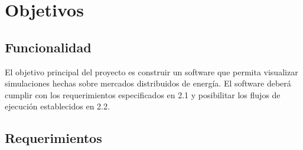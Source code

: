 \documentclass[12pt,a4paper,openright,oneside]{article}
\numberwithin{equation}{section}
\theoremstyle{definition}
\begin{document}













\section{Objetivos}

\subsection{Funcionalidad}
El objetivo principal del proyecto es construir un software que permita visualizar simulaciones hechas sobre mercados distribuidos de energía.
El software deberá cumplir con los requerimientos especificados en 2.1 y posibilitar los flujos de ejecución establecidos en 2.2.

\subsection{Requerimientos}
\end{document}

